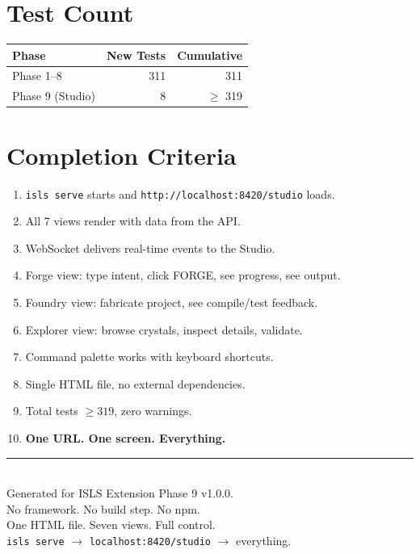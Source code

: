 \documentclass[11pt,a4paper,twoside]{article}
\newcommand{\ISLS}{\textsf{ISLS}}
\begin{document}
\section{Test Count}

\begin{tabular}{l r r}
\toprule
\textbf{Phase} & \textbf{New Tests} & \textbf{Cumulative} \\
\midrule
Phase 1--8 & 311 & 311 \\
Phase 9 (Studio) & 8 & $\ge$ 319 \\
\bottomrule
\end{tabular}

\section{Completion Criteria}

\begin{enumerate}[nosep]
  \item \texttt{isls serve} starts and \texttt{http://localhost:8420/studio}
        loads.
  \item All 7 views render with data from the API.
  \item WebSocket delivers real-time events to the Studio.
  \item Forge view: type intent, click FORGE, see progress, see output.
  \item Foundry view: fabricate project, see compile/test feedback.
  \item Explorer view: browse crystals, inspect details, validate.
  \item Command palette works with keyboard shortcuts.
  \item Single HTML file, no external dependencies.
  \item Total tests $\ge 319$, zero warnings.
  \item \textbf{One URL. One screen. Everything.}
\end{enumerate}

\vfill
\begin{center}
\rule{0.5\textwidth}{0.4pt}\\[0.5cm]
{\small Generated for \ISLS{} Extension Phase 9 v1.0.0.\\
No framework. No build step. No npm.\\
One HTML file. Seven views. Full control.\\[0.3cm]
\texttt{isls serve} $\to$ \texttt{localhost:8420/studio} $\to$ everything.}
\end{center}
\end{document}
